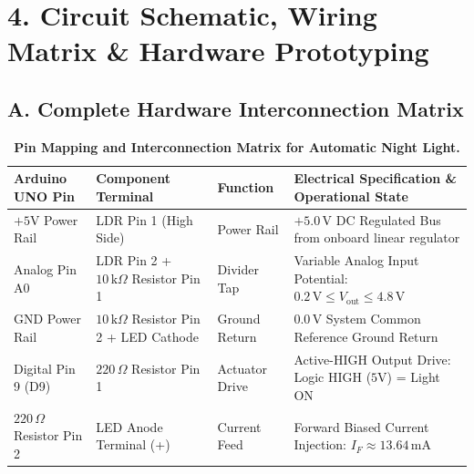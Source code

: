 \documentclass[10pt,a4paper]{article}
\begin{document}
\section*{4. Circuit Schematic, Wiring Matrix \& Hardware Prototyping}

\subsection*{A. Complete Hardware Interconnection Matrix}
\begin{table}[H]
\centering
\footnotesize
\renewcommand{\arraystretch}{1.08}
\begin{tabularx}{\textwidth}{|l|l|l|X|}
\hline
\textbf{Arduino UNO Pin} & \textbf{Component Terminal} & \textbf{Function} & \textbf{Electrical Specification \& Operational State} \\
\hline
$+5\text{V}$ Power Rail & LDR Pin 1 (High Side) & Power Rail & $+5.0\,\text{V}$ DC Regulated Bus from onboard linear regulator \\
Analog Pin A0 & LDR Pin 2 + $10\,\text{k}\Omega$ Resistor Pin 1 & Divider Tap & Variable Analog Input Potential: $0.2\,\text{V} \le V_{\text{out}} \le 4.8\,\text{V}$ \\
GND Power Rail & $10\,\text{k}\Omega$ Resistor Pin 2 + LED Cathode & Ground Return & $0.0\,\text{V}$ System Common Reference Ground Return \\
Digital Pin 9 (D9) & $220\,\Omega$ Resistor Pin 1 & Actuator Drive & Active-HIGH Output Drive: Logic HIGH ($5\text{V}$) = Light ON \\
$220\,\Omega$ Resistor Pin 2 & LED Anode Terminal (+) & Current Feed & Forward Biased Current Injection: $I_F \approx 13.64\,\text{mA}$ \\
\hline
\end{tabularx}
\caption{\textbf{Pin Mapping and Interconnection Matrix for Automatic Night Light.}}
\end{table}
\end{document}
